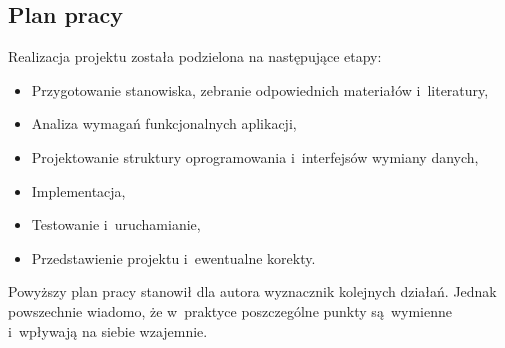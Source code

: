 \subsection{Plan pracy}
Realizacja projektu została podzielona na następujące etapy:
\begin{itemize}
\item Przygotowanie stanowiska, zebranie odpowiednich materiałów i~literatury,
\item Analiza wymagań funkcjonalnych aplikacji,
\item Projektowanie struktury oprogramowania i~interfejsów wymiany danych,
\item Implementacja,
\item Testowanie i~uruchamianie,
\item Przedstawienie projektu i~ewentualne korekty.
\end{itemize}
\indent
\indent Powyższy plan pracy stanowił dla autora wyznacznik kolejnych działań. Jednak powszechnie wiadomo, że w~praktyce poszczególne punkty są~wymienne i~wpływają na siebie wzajemnie.
